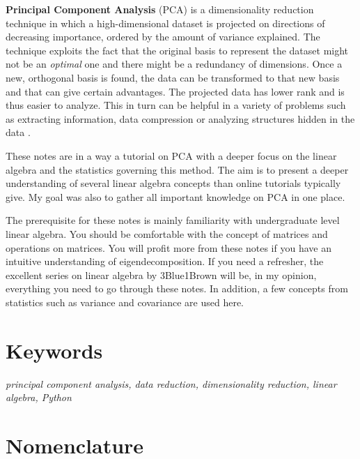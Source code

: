 \documentclass[10pt,twocolumn]{article}
\begin{document}
\setlength{\parindent}{0em}
\setlength{\parskip}{1em}

\textbf{Principal Component Analysis} (PCA) is a dimensionality reduction technique in which a high-dimensional dataset is projected on directions of decreasing importance, ordered by the amount of variance explained. The technique exploits the fact that the original basis to represent the dataset might not be an \textit{optimal} one and there might be a redundancy of dimensions. Once a new, orthogonal basis is found, the data can be transformed to that new basis and that can give certain advantages. The projected data has lower rank and is thus easier to analyze. This in turn can be helpful in a variety of problems such as extracting information, data compression or analyzing structures hidden in the data \cite{Abdi_Williams}.

These notes are in a way a tutorial on PCA with a deeper focus on the linear algebra and the statistics governing this method. The aim is to present a deeper understanding of several linear algebra concepts than online tutorials typically give. My goal was also to gather all important knowledge on PCA in one place. 

The prerequisite for these notes is mainly familiarity with undergraduate level linear algebra. You should be comfortable with the concept of matrices and operations on matrices. You will profit more from these notes if you have an intuitive understanding of eigendecomposition. If you need a refresher, the excellent series on linear algebra by 3Blue1Brown \cite{3Blue1Brown} will be, in my opinion, everything you need to go through these notes. In addition, a few concepts from statistics such as variance and covariance are used here.

\section*{Keywords}

\textit{principal component analysis, data reduction, dimensionality reduction, linear algebra, Python}

\newpage

\tableofcontents

\section*{Nomenclature}
\end{document}
